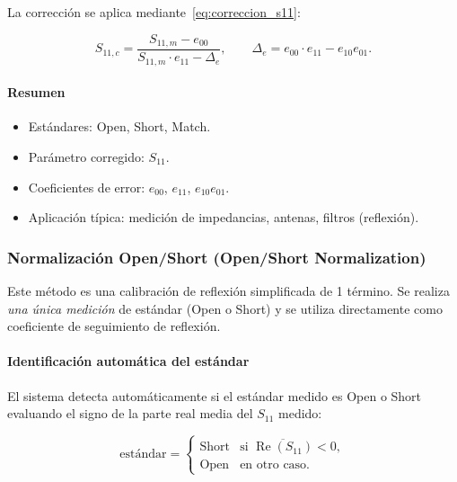 La corrección se aplica mediante~\eqref{eq:correccion_s11}:

\begin{equation}
    S_{11,c} = \frac{S_{11,m} - e_{00}}{S_{11,m}\cdot e_{11} - \Delta_e},
    \qquad \Delta_e = e_{00}\cdot e_{11} - e_{10}e_{01}.
    \nonumber
\end{equation}

\paragraph{Resumen}

\begin{itemize}
    \item Estándares: Open, Short, Match.
    \item Parámetro corregido: $S_{11}$.
    \item Coeficientes de error: $e_{00}$, $e_{11}$, $e_{10}e_{01}$.
    \item Aplicación típica: medición de impedancias, antenas, filtros (reflexión).
\end{itemize}

\subsubsection{Normalización Open/Short (Open/Short Normalization)}
\label{sec:os_norm}

Este método es una calibración de reflexión simplificada de 1 término.
Se realiza \emph{una única medición} de estándar (Open o Short) y se utiliza
directamente como coeficiente de seguimiento de reflexión.

\paragraph{Identificación automática del estándar}

El sistema detecta automáticamente si el estándar medido es Open o Short
evaluando el signo de la parte real media del $S_{11}$ medido:

\begin{equation}
    \text{estándar} =
    \begin{cases}
        \text{Short} & \text{si } \overline{\operatorname{Re}(S_{11})} < 0, \\
        \text{Open}  & \text{en otro caso.}
    \end{cases}
\end{equation}

